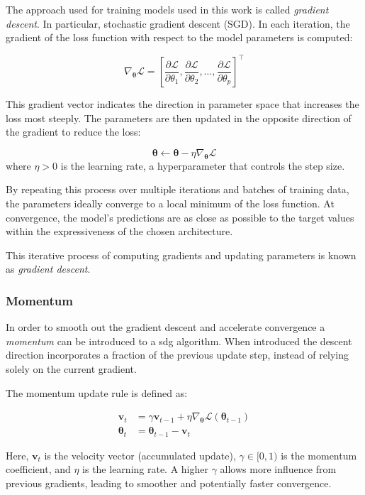 \documentclass{pracalicmgr}
\begin{document}
The approach used for training models used in this work is called \textit{gradient descent}. In particular, stochastic gradient descent (SGD). In each iteration, the gradient of the loss function with respect to the model parameters is computed:

\[
\nabla_{\boldsymbol{\theta}} \mathcal{L} = \left[ \frac{\partial \mathcal{L}}{\partial \theta_1}, \frac{\partial \mathcal{L}}{\partial \theta_2}, \dots, \frac{\partial \mathcal{L}}{\partial \theta_p} \right]^\top
\]

This gradient vector indicates the direction in parameter space that increases the loss most steeply. The parameters are then updated in the opposite direction of the gradient to reduce the loss:

\[
\boldsymbol{\theta} \leftarrow \boldsymbol{\theta} - \eta \nabla_{\boldsymbol{\theta}} \mathcal{L}
\]
where \( \eta > 0 \) is the learning rate, a hyperparameter that controls the step size.

By repeating this process over multiple iterations and batches of training data, the parameters ideally converge to a local minimum of the loss function. At convergence, the model's predictions are as close as possible to the target values within the expressiveness of the chosen architecture.

This iterative process of computing gradients and updating parameters is known as \textit{gradient descent}.

\subsubsection{Momentum}

In order to smooth out the gradient descent and accelerate convergence a \textit{momentum} can be introduced to a sdg algorithm. When introduced the descent direction incorporates a fraction of the previous update step, instead of relying solely on the current gradient.

The momentum update rule is defined as:

\[
\begin{aligned}
\mathbf{v}_t &= \gamma \mathbf{v}_{t-1} + \eta \nabla_{\boldsymbol{\theta}} \mathcal{L}(\boldsymbol{\theta}_{t-1}) \\
\boldsymbol{\theta}_t &= \boldsymbol{\theta}_{t-1} - \mathbf{v}_t
\end{aligned}
\]

Here, \( \mathbf{v}_t \) is the velocity vector (accumulated update), \( \gamma \in [0,1) \) is the momentum coefficient, and \( \eta \) is the learning rate. A higher \( \gamma \) allows more influence from previous gradients, leading to smoother and potentially faster convergence.
\end{document}
